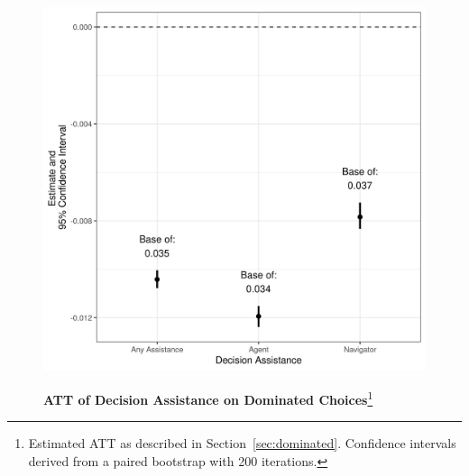 \documentclass[12pt]{article}
\begin{document}
\newpage
\begin{figure}[htb]
\centering
\footnotesize
\begin{minipage}[h]{6in}
\caption[caption]{\textbf{ATT of Decision Assistance on Dominated Choices}\footnote{Estimated ATT as described in Section~\ref{sec:dominated}. Confidence intervals derived from a paired bootstrap with 200 iterations.}}
\centerline{%
    \includegraphics[scale=0.75]{figures/dom_choice.png}
}
\label{fig:dom-choice}
\end{minipage}
\end{figure}
\end{document}
